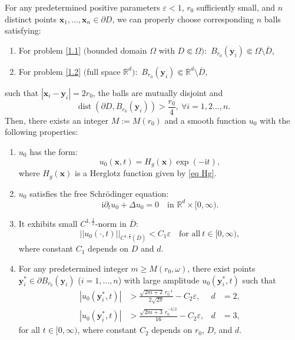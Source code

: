 \documentclass[10pt,a4paper]{amsart}
\begin{document}
	\begin{theorem}\label{thm:main_result}
		For any predetermined positive parameters $\varepsilon < 1$, $r_0$ sufficiently small, and $n$ distinct points $\mathbf{x}_1,\dots,\mathbf{x}_n \in \partial D$, we can properly choose corresponding $n$ balls satisfying:
		\begin{enumerate}
			\renewcommand{\labelenumi}{(\roman{enumi})}
			\item For problem \eqref{1.1} $($bounded domain $\Omega$ with $D \Subset \Omega):$ $B_{r_0}(\mathbf{y}_i) \Subset \Omega \setminus \overline{D}$,
			\item For problem \eqref{1.2} $($full space $\mathbb{R}^d ):$ $B_{r_0}(\mathbf{y}_i) \Subset \mathbb{R}^d \setminus \overline{D}$,
		\end{enumerate}
		such that $|\mathbf{x}_i - \mathbf{y}_i| = 2r_0$, the balls are mutually disjoint and
		$$
		\operatorname{dist}(\partial D, B_{r_0}(\mathbf{y}_i))>\frac{r_0}{4},\ \forall i=1,2...,n.
		$$
	Then, there exists an integer $M := M(r_0)$ and a smooth function $u_0$ with the following properties:
		\begin{enumerate}
			\item $u_0$ has the form$:$
			\begin{equation*}
				u_0(\mathbf{x},t) = H_g(\mathbf{x})\exp(-\mathrm{i} t),
			\end{equation*}
			where $ H_g(\mathbf{x})$ is a Herglotz function given by \eqref{eq Hg}. 
			
			\item $u_0$ satisfies the free Schr\"odinger equation$:$
			\[
			\mathrm{i}\partial_{t} u_0 + \Delta u_0 = 0 \quad \text{in } \mathbb{R}^d \times [0,\infty).
			\]
			
			\item It exhibits small $C^{1,\frac{1}{2}}$-norm in $\overline{D}:$
			\begin{equation}\label{u0 smalles}
				||u_0(\cdot,t)||_{C^{1,\frac{1}{2}}(\overline{D})} < C_1\varepsilon \quad \text{for all}~ t \in [0,\infty),
			\end{equation}
			where constant $C_1$ depends on $D$ and $d$.
			
			\item For any predetermined integer $m \geqslant M(r_0,\omega)$, there exist points $\mathbf{y}^*_i \in \partial B_{r_0}(\mathbf{y}_i)$  ($i=1,\dots,n$) with large amplitude $u_0(\mathbf{y}^*_i,t)$ such that
			\begin{align}
				|u_0(\mathbf{y}^*_i,t)| &> \frac{\sqrt{2m+2}\,r_0^{-1}}{2\sqrt{2\pi}} - C_2\varepsilon, & d &= 2, \label{2 d} \\
				|u_0(\mathbf{y}^*_i,t)| &> \frac{\sqrt{2m+3}\,r_0^{-3/2}}{16} - C_2\varepsilon, & d &= 3, \label{3 d}
			\end{align}
			for all $t \in [0,\infty)$, where constant $C_2$ depends on $r_0$, $D$, and $d$.
		\end{enumerate}
	\end{theorem}
\end{document}

